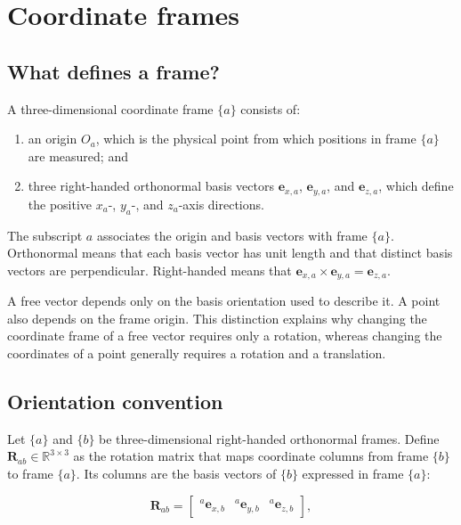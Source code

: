 \documentclass[
  australian,
  12pt,
  letterpaper,
  DIV=11,
  numbers=noendperiod,
  twoside]{scrreprt}
\providecommand{\tightlist}{%
  \setlength{\itemsep}{0pt}\setlength{\parskip}{0pt}}
\begin{document}
\section{Coordinate frames}\label{coordinate-frames}

\subsection{What defines a frame?}\label{what-defines-a-frame}

A three-dimensional coordinate frame \(\{a\}\) consists of:

\begin{enumerate}
\def\labelenumi{\arabic{enumi}.}
\tightlist
\item
  an origin \(O_a\), which is the physical point from which positions in
  frame \(\{a\}\) are measured; and
\item
  three right-handed orthonormal basis vectors \(\mathbf e_{x,a}\),
  \(\mathbf e_{y,a}\), and \(\mathbf e_{z,a}\), which define the
  positive \(x_a\)-, \(y_a\)-, and \(z_a\)-axis directions.
\end{enumerate}

The subscript \(a\) associates the origin and basis vectors with frame
\(\{a\}\). Orthonormal means that each basis vector has unit length and
that distinct basis vectors are perpendicular. Right-handed means that
\(\mathbf e_{x,a}\times\mathbf e_{y,a}=\mathbf e_{z,a}\).

A free vector depends only on the basis orientation used to describe it.
A point also depends on the frame origin. This distinction explains why
changing the coordinate frame of a free vector requires only a rotation,
whereas changing the coordinates of a point generally requires a
rotation and a translation.

\subsection{Orientation convention}\label{orientation-convention}

Let \(\{a\}\) and \(\{b\}\) be three-dimensional right-handed
orthonormal frames. Define \(\mathbf R_{ab}\in\mathbb R^{3\times3}\) as
the rotation matrix that maps coordinate columns from frame \(\{b\}\) to
frame \(\{a\}\). Its columns are the basis vectors of \(\{b\}\)
expressed in frame \(\{a\}\):

\[
\mathbf{R}_{ab}
=
\begin{bmatrix}
{}^{a}\mathbf{e}_{x,b} &
{}^{a}\mathbf{e}_{y,b} &
{}^{a}\mathbf{e}_{z,b}
\end{bmatrix},
\]
\end{document}
